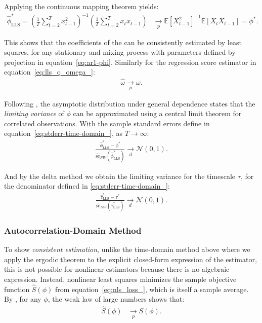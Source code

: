 \documentclass[docs/main.tex]{subfiles}
\begin{document}
\noindent Applying the continuous mapping theorem yields:
\begin{align}
    \hat\phi^*_{\scriptscriptstyle\text{LLS}} = \left(\frac{1}{T} \sum_{t=2}^T x_{t-1}^2\right)^{-1} \left( \frac{1}{T} \sum_{t=2}^T x_t x_{t-1}\right) &\underset{p}{\to} \mathbb{E}[X_{t-1}^2]^{-1}\mathbb{E}[X_t X_{t-1}] = \phi^*.
\end{align}

\noindent This shows that the coefficients of the  can be consistently estimated by least squares, for any stationary and mixing process with parameters defined by projection in equation~\eqref{eq:ar1-phi}. Similarly for the regression score estimator in equation~\eqref{eq:lls_q_omega_}:
\begin{align}
    \hat \omega \underset{p}{\to} \omega.
\end{align}

Following \citet[Theorem~14.33]{hansen_econometrics_2022}, the asymptotic distribution under general dependence states that the \textit{limiting variance} of $\phi$ can be approximated using a central limit theorem for correlated observations. With the sample standard errors define in equation~\eqref{eq:stderr-time-domain_}, as $T\to\infty$:
\begin{align} \label{eq:ar1-phi-clt}
\frac{\hat\phi^*_{\scriptscriptstyle\text{LLS}} - \phi^*}{\widehat{\text{se}}_{NW}(\hat\phi^*_{\scriptscriptstyle\text{LLS}})} \underset{d}{\to} \mathcal{N}(0, 1).
\end{align}

\noindent And by the delta method we obtain the limiting variance for the timescale $\tau$, for the denominator defined in \eqref{eq:stderr-time-domain_}:
\begin{align}
    \frac{\hat{\tau}^*_{\scriptscriptstyle\text{LLS}} - \tau^*}{\widehat{\text{se}}_{NW}(\hat{\tau}^*_{\scriptscriptstyle\text{LLS}}) } \underset{d}{\to} \mathcal{N}(0,1).
\end{align}



\subsubsection{Autocorrelation-Domain Method}

To show \textit{consistent estimation}, unlike the time-domain method above where we apply the ergodic theorem to the explicit closed-form expression of the estimator, this is not possible for nonlinear estimators because there is no algebraic expression. Instead, nonlinear least squares minimizes the sample objective function $\widehat{S}(\phi)$ from equation~\eqref{eq:nls_loss_}, which is itself a sample average. By \citet[Theorem~22.1]{hansen_econometrics_2022}, for any $\phi$, the weak law of large numbers shows that:
\begin{align}
\widehat{S}(\phi) &\underset{p}{\to} S(\phi).
\end{align}
\end{document}
